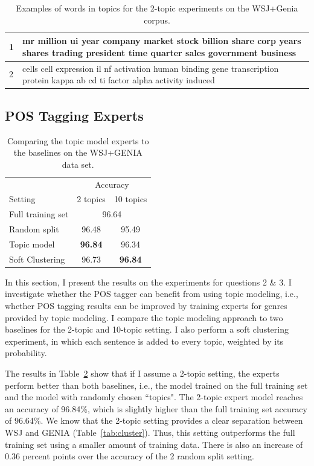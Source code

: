 \begin{table}[t!]
	\begin{tabular}{l|p{14cm}} 
	    1 & mr million ui year company market stock billion share corp years shares trading president time quarter sales government business \\ \hline 
		2 & cells cell expression il nf activation human binding gene  transcription protein kappa ab cd ti factor alpha activity induced     \\ \hline
		
	\end{tabular}
	\caption{Examples of words in topics for the 2-topic experiments on the WSJ+Genia corpus.}
	\label{tab:ex:2topics}
\end{table}

\subsection{POS Tagging Experts}



\begin{table}[t]
\centering
\begin{tabular}{l|cc}
 & \multicolumn{2}{c}{Accuracy} \\
Setting & \multicolumn{1}{r}{2 topics} & \multicolumn{1}{r}{10 topics} \\ \hline
Full training set & \multicolumn{2}{c}{96.64} \\
Random split & 96.48 & 95.49 \\
Topic model & \textbf{96.84} & 96.34 \\
Soft Clustering & 96.73 & \textbf{96.84} \\ \hline
\end{tabular}
\caption{Comparing the topic model experts to the baselines on the WSJ+GENIA data set.\label{tab:mixedresults}}
\end{table}


In this section, I present the results on the experiments for questions 2 \& 3. I investigate whether the POS tagger can benefit from using topic modeling, i.e., whether POS tagging results can be improved by training experts for genres provided by topic modeling. I compare the topic modeling approach to  two baselines for the 2-topic and 10-topic setting. I also perform a soft clustering experiment, in which each sentence is added to every topic, weighted by its probability.

The results in Table~\ref{tab:mixedresults} show that if I assume a 2-topic setting, the experts perform better than both baselines, i.e., the model trained on the full training set and the model with randomly chosen ``topics". The 2-topic expert model reaches an accuracy of 96.84\%, which is slightly higher than the full training set accuracy of 96.64\%. We know that the 2-topic setting provides a clear separation between WSJ and GENIA (Table~\ref{tab:cluster}). Thus, this setting outperforms the full training set using a smaller amount of training data. There is also an increase of 0.36 percent points over the accuracy of the 2 random split setting. 

